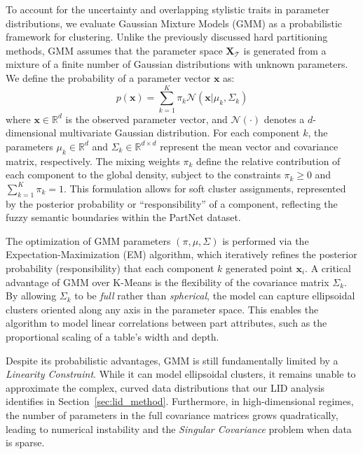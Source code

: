 \documentclass{thesis}
\begin{document}
To account for the uncertainty and overlapping stylistic traits in parameter distributions, we evaluate Gaussian Mixture Models (GMM) as a probabilistic framework for clustering. Unlike the previously discussed hard partitioning methods, GMM assumes that the parameter space $\mathbf{X}_{\mathcal{T}}$ is generated from a mixture of a finite number of Gaussian distributions with unknown parameters. We define the probability of a parameter vector $\mathbf{x}$ as:
\begin{equation}
    p(\mathbf{x}) = \sum_{k=1}^{K} \pi_k \mathcal{N}(\mathbf{x} | \mu_k, \Sigma_k)
\end{equation}
where $\mathbf{x} \in \mathbb{R}^d$ is the observed parameter vector, and $\mathcal{N}(\cdot)$ denotes a $d$-dimensional multivariate Gaussian distribution. For each component $k$, the parameters $\mu_k \in \mathbb{R}^d$ and $\Sigma_k \in \mathbb{R}^{d \times d}$ represent the mean vector and covariance matrix, respectively. The mixing weights $\pi_k$ define the relative contribution of each component to the global density, subject to the constraints $\pi_k \geq 0$ and $\sum_{k=1}^K \pi_k = 1$. This formulation allows for soft cluster assignments, represented by the posterior probability or ``responsibility'' of a component, reflecting the fuzzy semantic boundaries within the PartNet dataset.

The optimization of GMM parameters $(\pi, \mu, \Sigma)$ is performed via the Expectation-Maximization (EM) algorithm, which iteratively refines the posterior probability (responsibility) that each component $k$ generated point $\mathbf{x}_i$. A critical advantage of GMM over K-Means is the flexibility of the covariance matrix $\Sigma_k$. By allowing $\Sigma_k$ to be \textit{full} rather than \textit{spherical}, the model can capture ellipsoidal clusters oriented along any axis in the parameter space. This enables the algorithm to model linear correlations between part attributes, such as the proportional scaling of a table's width and depth.

Despite its probabilistic advantages, GMM is still fundamentally limited by a \textit{Linearity Constraint}. While it can model ellipsoidal clusters, it remains unable to approximate the complex, curved data distributions that our LID analysis identifies in Section~\ref{sec:lid_method}. Furthermore, in high-dimensional regimes, the number of parameters in the full covariance matrices grows quadratically, leading to numerical instability and the \textit{Singular Covariance} problem when data is sparse. 
\end{document}
